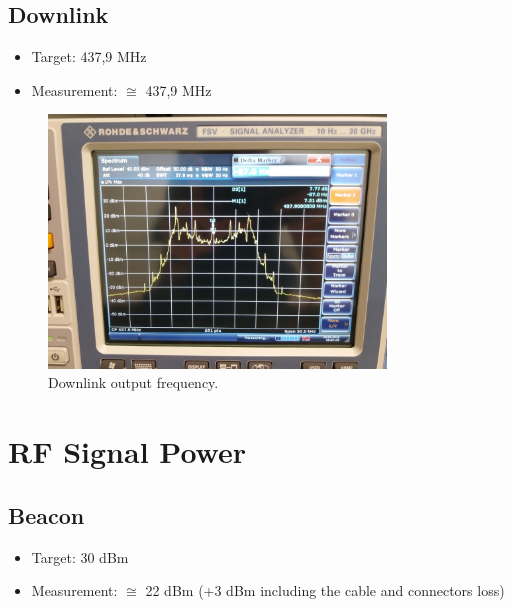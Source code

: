 \subsection{Downlink}

\begin{itemize}
    \item Target: 437,9 MHz
    \item Measurement: $\cong$ 437,9 MHz
\end{itemize}

\begin{figure}[H]
    \begin{center}
        \includegraphics[width=0.8\textwidth]{figures/tests/downlink_frequency.jpg}
        \caption{Downlink output frequency.}
        \label{fig:downlink-frequency}
    \end{center}
\end{figure}

\section{RF Signal Power}

\subsection{Beacon}

\begin{itemize}
    \item Target: 30 dBm
    \item Measurement: $\cong$ 22 dBm (+3 dBm including the cable and connectors loss)
\end{itemize}

